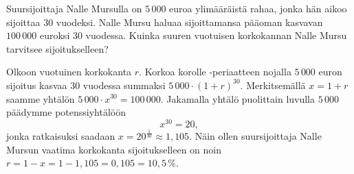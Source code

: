 \begin{esimerkki}
Suursijoittaja Nalle Mursulla on $5\,000$ euroa ylimääräistä rahaa, jonka hän aikoo sijoittaa $30$ vuodeksi.  Nalle Mursu haluaa sijoittamansa pääoman kasvavan $100\,000$ euroksi $30$ vuodessa.  Kuinka suuren vuotuisen korkokannan Nalle Mursu tarvitsee sijoitukselleen? 
	\begin{esimratk}
		Olkoon vuotuinen korkokanta $r$. Korkoa korolle -periaatteen nojalla $5\,000$ euron sijoitus kasvaa $30$ vuodessa summaksi $5\,000\cdot(1+r)^{30}$. Merkitsemällä $x=1+r$ saamme yhtälön $5\,000\cdot x^{30} = 100\,000$. Jakamalla yhtälö puolittain luvulla $5\,000$ päädymme potenssiyhtälöön
		\[ x^{30} = 20, \] 
		jonka ratkaisuksi saadaan $x=20^{\frac{1}{30}} \approx 1,105$. Näin ollen suursijoittaja Nalle Mursun vaatima korkokanta sijoitukselleen on noin $r=1-x=1-1,105=0,105=10,5\,\%$.
	\end{esimratk}
\end{esimerkki}

%
%
%
%
%
%
%


